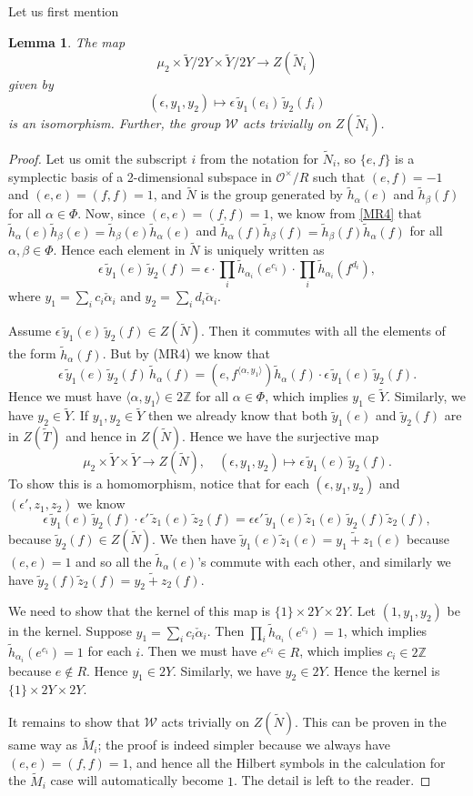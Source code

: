 \documentclass[10pt, letterpaper]{amsart}
\theoremstyle{plain}
\newtheorem{Lem}[equation]{Lemma}
\theoremstyle{definition}
\numberwithin{equation}{section}
\newcommand{\Z}{\mathbb{Z}}
\newcommand{\yt}{\tilde{y}}
\newcommand{\zt}{\tilde{z}}
\newcommand{\htt}{\tilde{h}}
\newcommand{\hta}{\tilde{h}_{\alpha}}
\newcommand{\htb}{\tilde{h}_{\beta}}
\newcommand{\alphac}{{\check{\alpha}}}
\newcommand{\Mt}{\widetilde{M}}
\newcommand{\Nt}{\widetilde{N}}
\newcommand{\Tt}{\widetilde{T}}
\newcommand{\Yt}{\widetilde{Y}}
\newcommand{\Ocal}{\mathcal{O}}
\newcommand{\Wcal}{\mathcal{W}}
\newcommand{\la}{\langle}
\newcommand{\ra}{\rangle}
\begin{document}
Let us first mention
\begin{Lem}
The map
\[
\mu_2\times \Yt\slash 2Y\times\Yt\slash 2Y\longrightarrow Z(\Nt_i)
\]
given by
\[
(\epsilon, y_1, y_2)\mapsto \epsilon\, \yt_1(e_i)\,\yt_2(f_i)
\]
is an isomorphism. Further, the group $\Wcal$ acts trivially on $Z(\Nt_i)$.
\end{Lem}
\begin{proof}
Let us omit the subscript $i$ from the notation for $\Nt_i$, so $\{e, f\}$ is a symplectic basis of a 2-dimensional subspace in $\Ocal^\times \slash R$ such that $(e, f)=-1$ and $(e, e)=(f, f)=1$, and $\Nt$ is the group generated by $\hta(e)$ and $\htb(f)$ for all $\alpha\in \Phi$. Now, since $(e, e)=(f, f)=1$, we know from \eqref{MR4} that $\hta(e)\htb(e)=\htb(e)\hta(e)$ and $\hta(f)\htb(f)=\htb(f)\hta(f)$ for all $\alpha, \beta\in\Phi$. Hence each element in $\Nt$ is uniquely written as
\[
\epsilon\, \yt_1(e)\,\yt_2(f)=\epsilon\cdot \prod_{i}\htt_{\alpha_i}(e^{c_i})\cdot \prod_{i}\htt_{\alpha_i}(f^{d_i}),
\]
where $y_1=\sum_{i}c_i\alphac_i$ and $y_2=\sum_{i}d_i\alphac_i$.

Assume $\epsilon\, \yt_1(e)\,\yt_2(f)\in Z(\Nt)$. Then it commutes with all the elements of the form $\hta(f)$. But by (MR4) we know that
\[
\epsilon\, \yt_1(e)\,\yt_2(f)\,\hta(f)=(e, f^{\la \alpha, y_1\ra})\hta(f)\cdot \epsilon\, \yt_1(e)\,\yt_2(f).
\]
Hence we must have $\la \alpha, y_1\ra\in2\Z$ for all $\alpha\in\Phi$, which implies $y_1\in\Yt$. Similarly, we have $y_2\in\Yt$. If $y_1, y_2\in\Yt$ then we already know that both $\yt_1(e)$ and $\yt_2(f)$ are in $Z(\Tt)$ and hence in $Z(\Nt)$. Hence we have the surjective map
\[
\mu_2\times \Yt\times\Yt\longrightarrow Z(\Nt),\quad (\epsilon, y_1, y_2)\mapsto \epsilon\, \yt_1(e)\,\yt_2(f).
\]
To show this is a homomorphism, notice that for each $(\epsilon, y_1, y_2)$ and $(\epsilon', z_1, z_2)$ we know
\[
\epsilon\, \yt_1(e)\,\yt_2(f)\cdot \epsilon'\, \zt_1(e)\,\zt_2(f)=\epsilon\epsilon'\, \yt_1(e)\zt_1(e)\,\yt_2(f)\zt_2(f),
\]
because $\yt_2(f)\in Z(\Nt)$. We then have $\yt_1(e)\zt_1(e)=\widetilde{y_1+z_1}(e)$ because $(e,e)=1$ and so all the $\hta(e)$'s commute with each other, and similarly we have $\yt_2(f)\zt_2(f)=\widetilde{y_2+z_2}(f)$.

We need to show that the kernel of this map is $\{1\}\times 2Y\times 2Y$. Let $(1, y_1, y_2)$ be in the kernel. Suppose $y_1=\sum_{i}c_i\alphac_i$. Then $\prod_{i}\htt_{\alpha_i}(e^{c_i})=1$, which implies $\htt_{\alpha_i}(e^{c_i})=1$ for each $i$. Then we must have $e^{c_i}\in R$, which implies $c_i\in 2\Z$ because $e\notin R$. Hence $y_1\in 2Y$. Similarly, we have $y_2\in 2Y$. Hence the kernel is $\{1\}\times 2Y\times 2Y$. 

It remains to show that $\Wcal$ acts trivially on $Z(\Nt)$. This can be proven in the same way as $\Mt_i$; the proof is indeed simpler because we always have $(e, e)=(f, f)=1$, and hence all the Hilbert symbols in the calculation for the $\Mt_i$ case will automatically become $1$. The detail is left to the reader.
\end{proof}
\end{document}
